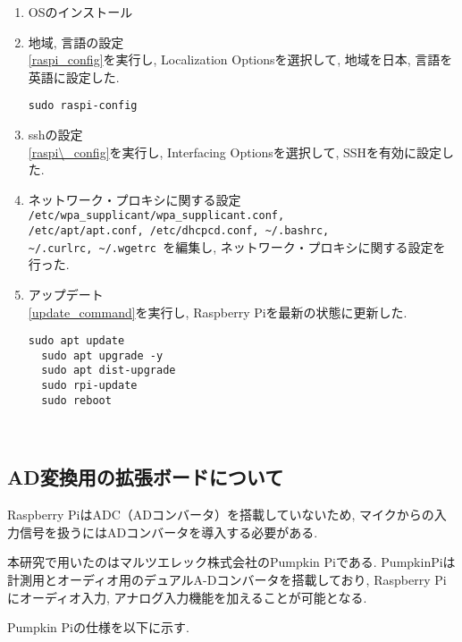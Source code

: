 \begin{enumerate}
\renewcommand{\labelenumi}{(\arabic{enumi})}
\item
  OSのインストール
\item
  地域, 言語の設定 \\
  \ref{raspi_config}を実行し, Localization Optionsを選択して, 地域を日本, 言語を英語に設定した. 
  \begin{lstlisting}[caption=Raspberry Piのコンフィグレーションツールの起動コマンド, label=raspi_config]
  sudo raspi-config
  \end{lstlisting}
\item
  sshの設定 \\
  \ref{raspi\_config}を実行し, Interfacing Optionsを選択して, SSHを有効に設定した. 
\item
  ネットワーク・プロキシに関する設定 \\
  \texttt{/etc/wpa\_supplicant/wpa\_supplicant.conf, \\
  /etc/apt/apt.conf, 
  /etc/dhcpcd.conf, 
  \textasciitilde/.bashrc, \\
  \textasciitilde/.curlrc, 
  \textasciitilde/.wgetrc
  }を編集し, ネットワーク・プロキシに関する設定を行った. 

\item
  アップデート \\
  \ref{update_command}を実行し, Raspberry Piを最新の状態に更新した. 

  \begin{lstlisting}[caption=Raspberry Piのアップデートコマンド,label=update_command]
  sudo apt update 
  sudo apt upgrade -y 
  sudo apt dist-upgrade
  sudo rpi-update
  sudo reboot
  \end{lstlisting}
\end{enumerate}

\
\subsection{AD変換用の拡張ボードについて}\label{about-adc}

Raspberry PiはADC（ADコンバータ）を搭載していないため, マイクからの入力信号を扱うにはADコンバータを導入する必要がある. 

本研究で用いたのはマルツエレック株式会社のPumpkin Pi\cite{pumpkin_pi:online}である. PumpkinPiは計測用とオーディオ用のデュアルA-Dコンバータを搭載しており, Raspberry Piにオーディオ入力, アナログ入力機能を加えることが可能となる. 

Pumpkin Piの仕様を以下に示す. 

